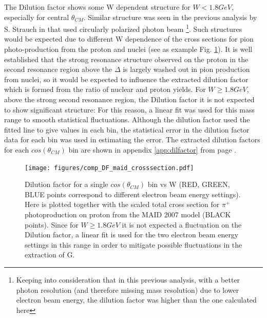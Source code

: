 The Dilution factor shows some W dependent structure for $W < 1.8GeV$, especially for central $\theta_{CM}$. Similar structure was seen in the previous analysis by S. Strauch in \cite{Strauch_2014} that used circularly polarized photon beam \footnote{Keeping into consideration that in this previous analysis, with a better photon resolution (and therefore missing mass resolution) due to lower electron beam energy, the dilution factor was higher than the one calculated here}. Such structures would be expected due to different W dependence of the cross sections for pion photo-production from the proton and nuclei (see as example Fig. \ref{fig:comparison_dilutionfactor}). It is well established that the strong resonance structure observed on the proton in the second resonance region above the $\Delta$  is largely washed out in pion production from nuclei, so it would be expected to influence the extracted dilution factor which is formed from the ratio of nuclear and proton yields. For $W \geq 1.8GeV$, above the strong second resonance region, the Dilution factor it is not expected to show significant structure: For this reason, a linear fit was used for this mass range to smooth statistical fluctuations. Although the dilution factor used the fitted line to give values in each bin, the statistical error in the dilution factor data for each bin was used in estimating the error. The extracted dilution factors for each $cos(\theta_{CM})$ bin are shown in  appendix \ref{app:dilfactor} from page \pageref{app:dilfactor}.  

\begin{figure}[H]
  \begin{center}
    \texttt{[image: figures/comp\_DF\_maid\_crosssection.pdf]} \\
    \caption{Dilution factor for a single $cos(\theta_{CM})$ bin vs W (RED, GREEN, BLUE points correspond to different electron beam energy settings). Here is plotted together with the scaled total cross section for $\pi^+$ photoproduction on proton from the MAID 2007 model \cite{MAID_2007} (BLACK points). Since for $W \geq 1.8GeV$ it is not expected a fluctuation on the Dilution factor, a linear fit is used for the two electron beam energy settings in this range in order to mitigate possible fluctuations in the extraction of G.}
    \label{fig:comparison_dilutionfactor}
  \end{center}
\end{figure}


